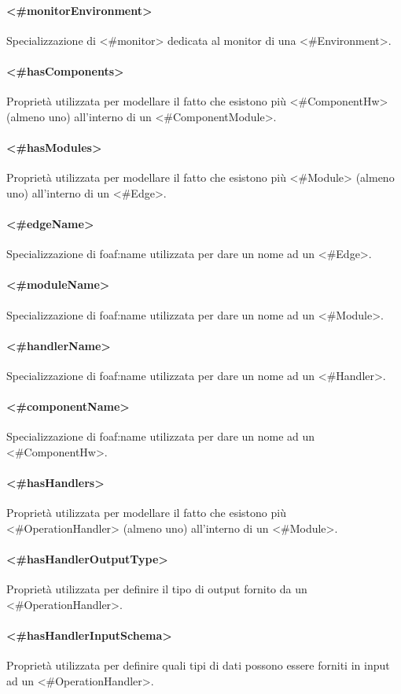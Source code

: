 \paragraph{<\#monitorEnvironment>}
Specializzazione di <\#monitor> dedicata al monitor di una <\#Environment>.
\paragraph{<\#hasComponents>}
Proprietà utilizzata per modellare il fatto che esistono più <\#ComponentHw> (almeno uno) all'interno di un <\#ComponentModule>.
\paragraph{<\#hasModules>}
Proprietà utilizzata per modellare il fatto che esistono più <\#Module> (almeno uno) all'interno di un <\#Edge>.
\paragraph{<\#edgeName>}
Specializzazione di foaf:name utilizzata per dare un nome ad un <\#Edge>.
\paragraph{<\#moduleName>}
Specializzazione di foaf:name utilizzata per dare un nome ad un <\#Module>.
\paragraph{<\#handlerName>}
Specializzazione di foaf:name utilizzata per dare un nome ad un <\#Handler>.
\paragraph{<\#componentName>}
Specializzazione di foaf:name utilizzata per dare un nome ad un <\#ComponentHw>.
\paragraph{<\#hasHandlers>}
Proprietà utilizzata per modellare il fatto che esistono più <\#OperationHandler> (almeno uno) all'interno di un <\#Module>.
\paragraph{<\#hasHandlerOutputType>}
Proprietà utilizzata per definire il tipo di output fornito da un <\#OperationHandler>.
\paragraph{<\#hasHandlerInputSchema>}
Proprietà utilizzata per definire quali tipi di dati possono essere forniti in input ad un <\#OperationHandler>.
